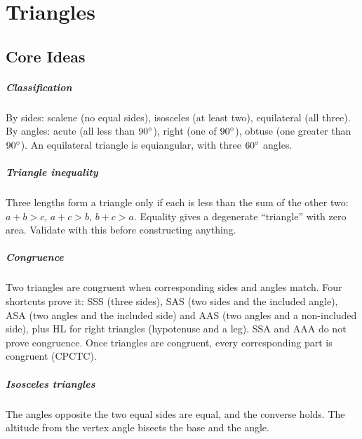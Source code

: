 \chapter{Triangles}


\section{Core Ideas}

\paragraph{Classification} By sides: scalene (no equal sides), isosceles (at least two), equilateral (all three). By angles: acute (all less than $90^\circ$), right (one of $90^\circ$), obtuse (one greater than $90^\circ$). An equilateral triangle is equiangular, with three $60^\circ$ angles.

\paragraph{Triangle inequality} Three lengths form a triangle only if each is less than the sum of the other two: $a + b > c$, $a + c > b$, $b + c > a$. Equality gives a degenerate ``triangle'' with zero area. Validate with this before constructing anything.

\paragraph{Congruence} Two triangles are congruent when corresponding sides and angles match. Four shortcuts prove it: SSS (three sides), SAS (two sides and the included angle), ASA (two angles and the included side) and AAS (two angles and a non-included side), plus HL for right triangles (hypotenuse and a leg). SSA and AAA do not prove congruence. Once triangles are congruent, every corresponding part is congruent (CPCTC).

\paragraph{Isosceles triangles} The angles opposite the two equal sides are equal, and the converse holds. The altitude from the vertex angle bisects the base and the angle.

